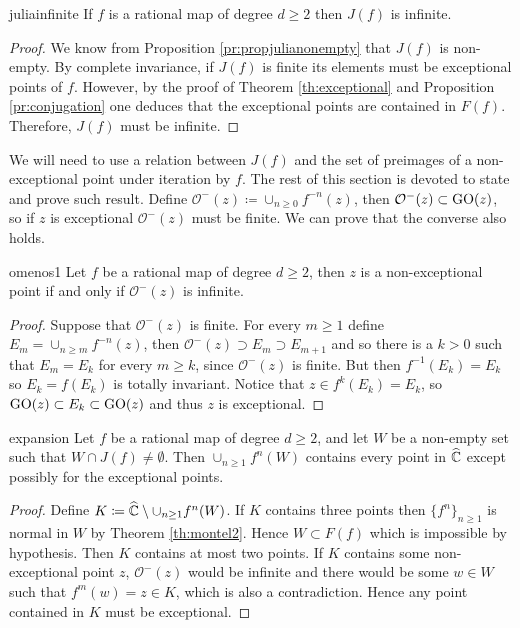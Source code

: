 \begin{mycoro}{}{juliainfinite}
If $f$ is a rational map of degree $d\geq 2$ then $J(f)$ is infinite.
\end{mycoro}

\begin{proof}
We know from Proposition \ref{pr:propjulianonempty} that $J(f)$ is non-empty. By complete invariance, if $J(f)$ is finite its elements must be exceptional points of $f$. However, by the proof of Theorem \ref{th:exceptional} and Proposition \ref{pr:conjugation} one deduces that the exceptional points are contained in $F(f)$. Therefore, $J(f)$ must be infinite.
\end{proof}

We will need to use a relation between $J(f)$ and the set of preimages of a non-exceptional point under iteration by $f$. The rest of this section is devoted to state and prove such result. Define 
$\mathcal{O}^-(z) \coloneqq \cup_{n\geq 0} f^{-n}(z)$, then $\mathcal{O}^-(z) \subset \text{GO}(z)$, so if $z$ is exceptional $\mathcal{O}^-(z)$ must be finite.  We can prove that the converse also holds.\\

\begin{myprop}{}{omenos1}
Let $f$ be a rational map of degree $d\geq 2$, then $z$ is a non-exceptional point if and only if $\mathcal{O}^-(z)$ is infinite.
\end{myprop}

\begin{proof}
Suppose that $\mathcal{O}^-(z)$ is finite. For every $m\geq 1$ define $E_m= \cup_{n\geq m} f^{-n}(z)$, then $\mathcal{O}^-(z)\supset E_m \supset E_{m+1}$ and so there is a $k>0$ such that $E_{m}=E_k$ for every $m\geq k$, since $\mathcal{O}^-(z)$ is finite. But then $f^{-1}(E_k)=E_k$ so $E_k = f(E_k)$ is totally invariant. Notice that $z\in f^k(E_k)=E_k$, so $\text{GO}(z) \subset E_k \subset \text{GO}(z)$ and thus $z$ is exceptional.
\end{proof}

\begin{mytheo}{}{expansion}
Let $f$ be a rational map of degree $d\geq 2$, and let $W$ be a non-empty set such that $W\cap J(f)\neq \emptyset$. Then $\cup_{n\geq 1}f^n(W)$ contains every point in $\widehat{\mathbb{C}}$ except possibly for the exceptional points.
\end{mytheo}

\begin{proof}
Define $K\coloneqq \widehat{\mathbb{C}} \setminus \cup_{n\geq 1}f^n(W)$. If $K$ contains three points then $\{f^n\}_{n\geq 1}$ is normal in $W$ by Theorem \ref{th:montel2}. Hence $W\subset F(f)$ which is impossible by hypothesis. Then $K$ contains at most two points. If $K$ contains some non-exceptional point $z$, $\mathcal{O}^-(z)$ would be infinite and there would be some $w\in W$ such that $f^m(w)=z\in K$, which is also a contradiction. Hence any point contained in $K$ must be exceptional.
\end{proof}

